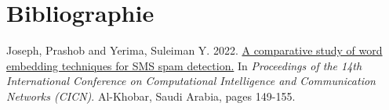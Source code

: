 \section{Bibliographie}

\hypertarget{ref1}{Joseph, Prashob and Yerima, Suleiman Y. 2022. \href{https://www.researchgate.net/profile/Suleiman-Yerima/publication/366445312_A_Comparative_Study_of_Word_Embedding_Techniques_for_SMS_Spam_Detection/links/63a2031641663a23c0714311/A-Comparative-Study-of-Word-Embedding-Techniques-for-SMS-Spam-Detection.pdf}{A comparative study of word embedding techniques for SMS spam detection.} 
In \textit{Proceedings of the 14th International Conference on Computational Intelligence and Communication Networks (CICN)}. Al-Khobar, Saudi Arabia, pages 149-155.}\\

